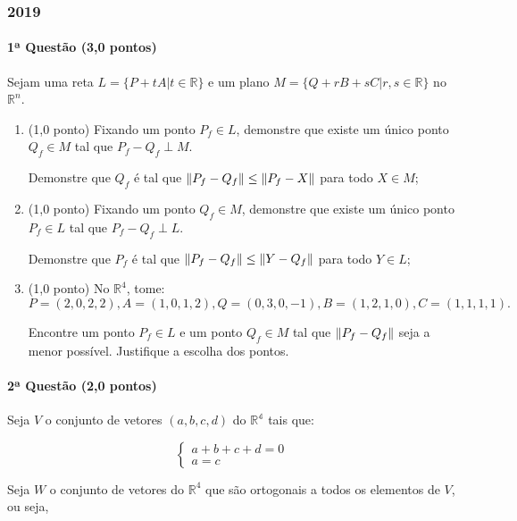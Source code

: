 \documentclass[12pt,a4paper]{article}
\newcommand{\R}{\mathbb{R}}
\begin{document}
\subsubsection{2019}

\paragraph{1ª Questão (3,0 pontos)}

Sejam uma reta $L = \{P + tA | t \in \mathbb{R}\}$ e um plano $M = \{Q + rB + sC | r, s \in \mathbb{R}\}$ no $\R^n$.

\begin{enumerate}[label=\alph*)]
    \item (1,0 ponto) Fixando um ponto $P_f \in L$, demonstre que existe um único ponto $Q_f \in M$ tal que $P_f - Q_f \perp M$.

        Demonstre que $Q_f$ é tal que $\Arrowvert P_f - Q_f \Arrowvert \leq \Arrowvert P_f - X \Arrowvert$ para todo $X \in M$;
    

    \item (1,0 ponto) Fixando um ponto $Q_f \in M$, demonstre que existe um único ponto $P_f \in L$ tal que $P_f - Q_f \perp L$.

        Demonstre que $P_f$ é tal que $\Arrowvert P_f - Q_f \Arrowvert \leq \Arrowvert Y - Q_f \Arrowvert$ para todo $Y \in L$;
    \item (1,0 ponto) No $\R^4$, tome: 
    $$P = (2,0,2,2), A = (1,0,1,2), Q = (0,3,0,-1), B = (1,2,1,0), C = (1,1,1,1).$$

    Encontre um ponto $P_f \in L$ e um ponto $Q_f \in M$ tal que $\Arrowvert P_f - Q_f \Arrowvert$ seja a menor possível. Justifique a escolha dos pontos.
\end{enumerate}


\paragraph{2ª Questão (2,0 pontos)}

Seja $V$ o conjunto de vetores $(a, b, c, d)$ do $\mathbb{R^4}$ tais que: 

$$ \begin{cases}

        a + b + c + d = 0 \\
        a = c

    \end{cases} $$


Seja $W$ o conjunto de vetores do $\R^4$ que são ortogonais a todos os elementos de $V$, ou seja,
\end{document}
